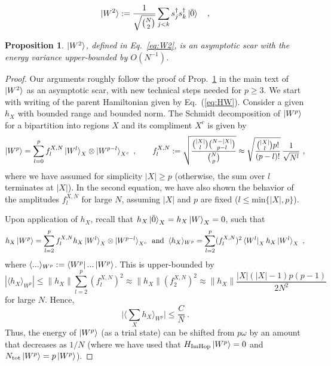 \documentclass[10pt,a4paper]{amsart}
\newtheorem{prop}{Proposition}
\newcommand{\defn}{:=}
\begin{document}
\begin{equation}
    \ket{W^2} \defn \frac{1}{\sqrt{\binom{N}{2}}} \sum_{j < k} s_j^\dagger s_k^\dagger \ket{\bar{0}}\quad,
    \label{eq:W2}
\end{equation}

\begin{prop}
\label{prop:W2}
    $\ket{W^2}$, defined in Eq.~\eqref{eq:W2}, is an asymptotic scar with the energy variance upper-bounded by $O(N^{-1})$.
\end{prop}

\begin{proof}
    Our arguments roughly follow the proof of Prop.~\ref{prop:W2} in the main text of $\ket{W^2}$ as an asymptotic scar, with new technical steps needed for $p \geq 3$.
    We start with writing of the parent Hamiltonian given by Eq.~(\ref{eq:HW}).
    Consider a given $h_X$ with bounded range and bounded norm.
    The Schmidt decomposition of $\ket{W^p}$ for a bipartition into regions $X$ and its compliment $X^c$ is given by
    \begin{equation}
        \ket{W^p} = \sum_{l=0}^{p}  f_{l}^{X,N} \ket{W^l}_X\otimes \ket{W^{p-l}}_{X^c} ~, \qquad
        f_{l}^{X,N} \defn \sqrt{\frac{\binom{|X|}{l}\binom{N-|X|}{p-l}}{\binom{N}{p}}} \approx \sqrt{\frac{\binom{|X|}{l} p!}{(p-l)!}}\, \frac{1}{\sqrt{N^l}} ~,
        \label{eq:flapprox}
    \end{equation}
    where we have assumed for simplicity $|X| \geq p$ (otherwise, the sum over $l$ terminates at $|X|$).
    In the second equation, we have also shown the behavior of the amplitudes $f_{l}^{X,N}$ for large $N$, assuming $|X|$ and $p$ are fixed ($l \leq \text{min}\{|X|,p\}$).

    Upon application of $h_X$, recall that $h_X\ket{\bar{0}}_X=h_X\ket{W}_X=0$, such that
    \begin{equation}
    h_X \ket{W^p} = \sum_{l=2}^{p} f_{l}^{X,N} h_X \ket{W^l}_X\otimes \ket{W^{p-l}}_{X^c}\,\;\text{and}\;\;\langle h_X \rangle_{W^p} = \sum_{l=2}^p (f_{l}^{X,N})^2 \bra{W^l}_X h_X \ket{W^l}_X ~,
    \label{eq:hXWp}
    \end{equation}
    where $\langle...\rangle_{W^p}:=\bra{W^p}...\ket{W^p}$.
    This is upper-bounded by
    \begin{equation}
    |\langle h_X \rangle_{W^p}| \leq \|h_X\| \sum_{l=2}^p (f_{l}^{X,N})^2 \approx \|h_X\| (f_{2}^{X,N})^2
    \approx \|h_X\| \frac{|X|(|X|-1) p(p-1)}{2 N^2}
    \end{equation}
    for large $N$.
    Hence,
    \begin{equation}
    \big|\big\langle \sum_X h_X \big\rangle_{W^p}\big| \leq \frac{C}{N} ~.
    \label{eq:h_XWpexp}
    \end{equation}
    Thus, the energy of $\ket{W^p}$ (as a trial state) can be shifted from $p \omega$ by an amount that decreases as $1/N$ (where we have used that $H_{\text{ImHop}} \ket{W^p} = 0$ and $N_{\text{tot}} \ket{W^p} = p \ket{W^p}$).


\end{proof}
\end{document}
